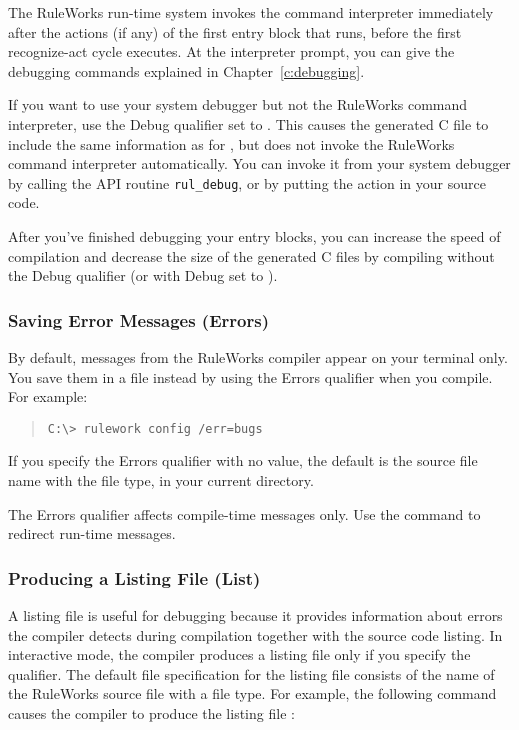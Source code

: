 The RuleWorks run-time system invokes the command interpreter
immediately after the  actions (if any) of the first
entry block that runs, before the first recognize-act cycle
executes. At the interpreter prompt, you can give the debugging
commands explained in Chapter~\ref{c:debugging}.

If you want to use your system debugger but not the RuleWorks command
interpreter, use the Debug qualifier set to . This causes
the generated C file to include the same information as for ,
but does not invoke the RuleWorks command interpreter
automatically. You can invoke it from your system debugger by calling
the API routine \verb|rul_debug|, or by putting the  action
in your source code.

After you've finished debugging your entry blocks, you can increase
the speed of compilation and decrease the size of the generated C
files by compiling without the Debug qualifier (or with Debug set to
).

\subsubsection{Saving Error Messages (Errors)}

By default, messages from the RuleWorks compiler appear
on your terminal only. You save them in a file instead by
using the Errors qualifier when you compile. For example:

\begin{quote}
\begin{verbatim}
C:\> rulework config /err=bugs
\end{verbatim}
\end{quote}  

If you specify the Errors qualifier with no value, the default is the
source file name with the  file type, in your current
directory.

The Errors qualifier affects compile-time messages only.
Use the  command to redirect run-time messages.

\subsubsection{Producing a Listing File (List)}

A listing file is useful for debugging because it provides information
about errors the compiler detects during compilation together with the
source code listing.  In interactive mode, the compiler produces a
listing file only if you specify the  qualifier. The default
file specification for the listing file consists of the name of the
RuleWorks source file with a  file type. For example, the
following command causes the compiler to produce the listing file
:

